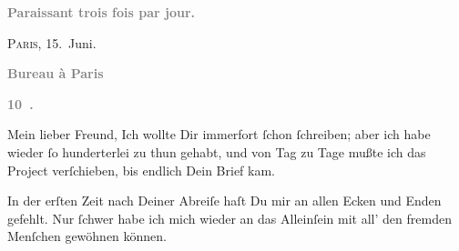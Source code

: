 \pstart
           \begin{otherlanguage}{french}\textcolor{gray}{\textbf{\textbf{Paraissant trois fois par jour.}}}\end{otherlanguage}\hfill \textsc{Paris}, 15. Juni.\pend
           
\pstart
           \begin{otherlanguage}{french}\textcolor{gray}{\textbf{\textbf{Bureau à Paris}}}\end{otherlanguage}\pend
           
\pstart
           \begin{otherlanguage}{french}\textcolor{gray}{\textbf{\textbf{10 .}}}\end{otherlanguage}\pend
           
\pstart\center{}Mein lieber Freund,\pend\vspace{0.5em}
\pstart
           Ich wollte Dir immerfort{ }ſchon{ }ſchreiben; aber ich habe wieder{ }ſo hunderterlei zu
               thun gehabt, und von Tag zu Tage mußte ich das Project verſchieben, bis endlich Dein
               Brief kam.\pend
           
\pstart
           In der erſten Zeit nach Deiner Abreiſe haſt Du mir an allen Ecken und Enden gefehlt.
               Nur{ }ſchwer habe ich mich wieder an das Alleinſein mit  all’ den fremden Menſchen gewöhnen können.\pend
           
